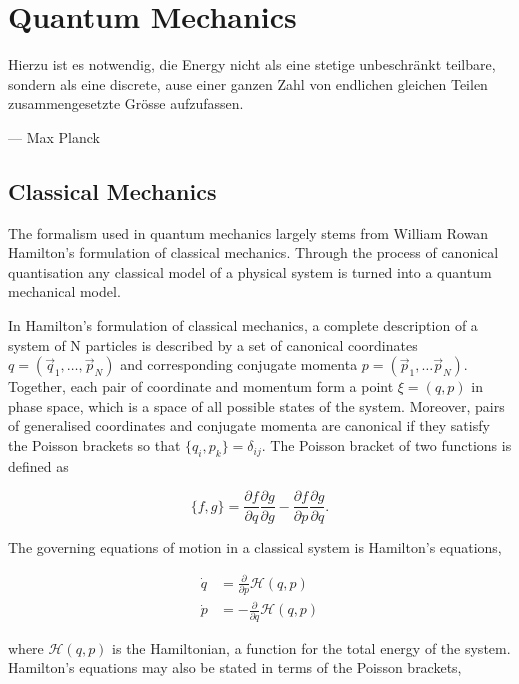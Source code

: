 \chapter{Quantum Mechanics}
    \epigraph{Hierzu ist es notwendig, die Energy nicht als eine stetige
    unbeschränkt teilbare, sondern als eine discrete, ause einer ganzen
    Zahl von endlichen gleichen Teilen zusammengesetzte Grösse 
    aufzufassen.}
    {--- Max Planck}


\section{Classical Mechanics}

    The formalism used in quantum mechanics largely stems from William Rowan Hamilton's 
    formulation of classical mechanics. Through the process of canonical
    quantisation any classical model of a physical system is turned into
    a quantum mechanical model.

    In Hamilton's formulation of classical mechanics, a complete description of a system
    of N particles is described by a set of canonical coordinates 
    $q = (\vec{q}_1, \dots, \vec{p}_N)$ and corresponding conjugate momenta
    $p = (\vec{p}_1, \dots \vec{p}_N)$. Together, each pair of coordinate and momentum
    form a point $\xi = (q, p)$ in phase space, which is a space of all possible states
    of the system. Moreover, pairs of generalised coordinates and conjugate
    momenta are canonical if they satisfy the Poisson brackets so that 
    $\{q_i, p_k\} = \delta_{ij}$. The Poisson bracket of two functions is defined as 

    \begin{equation}
        \{f, g\} = \frac{\partial f}{\partial q} \frac{\partial g}{\partial g}
        - \frac{\partial f}{\partial p} \frac{\partial g}{\partial q}.
    \end{equation}

    The governing equations of motion in a classical system is Hamilton's equations,

    \begin{align}
        \dot{q} &= \frac{\partial}{\partial p} \mathscr{H}(q, p) \\
        \dot{p} &= -\frac{\partial}{\partial q} \mathscr{H}(q, p)
    \end{align}

    where $\mathscr{H}(q, p)$ is the Hamiltonian, a function for the total energy of the
    system. Hamilton's equations may also be stated in terms of the Poisson brackets,

